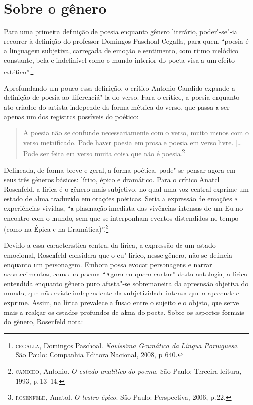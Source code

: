 
\section{Sobre o gênero}

Para uma primeira definição de poesia enquanto gênero literário, poder"-se"-ia recorrer à definição do professor Domingos Paschoal Cegalla, para quem ``poesia é a linguagem subjetiva, carregada de emoção e sentimento, com ritmo melódico constante, bela e indefinível como o mundo interior do poeta visa a um efeito estético''.\footnote{\textsc{cegalla}, Domingos Paschoal. \textit{Novíssima Gramática da Língua Portuguesa}. São Paulo: Companhia Editora Nacional, 2008, p.\,640.}

Aprofundando um pouco essa definição, o crítico Antonio Candido expande a definição de poesia ao diferenciá"-la do verso.
Para o crítico, a poesia enquanto ato criador do artista independe da forma métrica do verso, que passa a ser apenas um dos registros possíveis do poético:

\begin{quote}
A poesia não se confunde necessariamente com o verso, muito menos com o verso metrificado. Pode haver poesia em prosa e poesia em verso livre. [\ldots]
Pode ser feita em verso muita coisa que não é poesia.\footnote{\textsc{candido}, Antonio. \textit{O estudo analítico do poema}. São Paulo: Terceira leitura, 1993, p.\,13--14.}
\end{quote}

Delineada, de forma breve e geral, a forma poética, pode"-se pensar agora em seus três gêneros básicos: lírico, épico e dramático.
Para o crítico Anatol Rosenfeld, a lírica é o gênero mais subjetivo, no qual uma voz central exprime um estado de alma traduzido em orações poéticas.
Seria a expressão de emoções e experiências vividas, ``a plasmação imediata das vivências intensas de um Eu no encontro com o mundo, sem que se interponham eventos distendidos no tempo (como na Épica e na Dramática)''.\footnote{\textsc{rosenfeld}, Anatol. \textit{O teatro épico}. São Paulo: Perspectiva, 2006, p.\,22.}

Devido a essa característica central da lírica, a expressão de um estado emocional, Rosenfeld considera que o eu"-lírico, nesse gênero, não se delineia enquanto um personagem. Embora possa evocar personagens e narrar acontecimentos, como no poema ``Agora eu quero cantar'' desta antologia, a lírica entendida enquanto gênero puro afasta"-se sobremaneira da apreensão objetiva do mundo, que não existe independente da subjetividade intensa que o apreende e exprime. Assim, na lírica prevalece a fusão entre o sujeito e o objeto, que serve mais a realçar os estados profundos de alma do poeta.
Sobre os aspectos formais do gênero, Rosenfeld nota:

